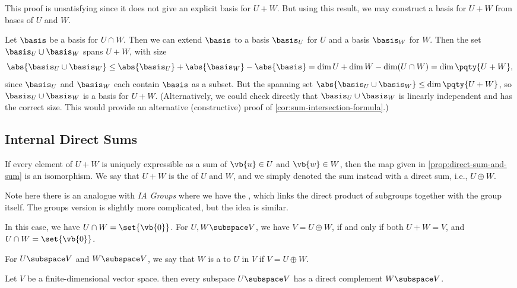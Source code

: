 This proof is unsatisfying since it does not give an explicit basis for \(U + W\). But using this result, we may construct a basis for \(U + W\) from bases of \(U\) and \(W\).

Let \(\basis\) be a basis for \(U \cap W\). Then we can extend \(\basis\) to a basis \(\basis_U\) for \(U\) and a basis \(\basis_W\) for \(W\). Then the set \(\basis_U \cup \basis_W\) spans \(U + W\), with size
\[
    \abs{\basis_U \cup \basis_W} \leq \abs{\basis_U} + \abs{\basis_W} - \abs{\basis} = \dim U + \dim W - \dim(U \cap W) = \dim \pqty{U + W},
\]
since \(\basis_U\) and \(\basis_W\) each contain \(\basis\) as a subset. But the spanning set \(\abs{\basis_U \cup \basis_W} \leq \dim \pqty{U + W}\), so \(\basis_U \cup \basis_W\) is a basis for \(U + W\). (Alternatively, we could check directly that \(\basis_U \cup \basis_W\) is linearly independent and has the correct size. This would provide an alternative (constructive) proof of \autoref{cor:sum-intersection-formula}.)

\subsection{Internal Direct Sums}

If every element of \(U + W\) is uniquely expressible as a sum of \(\vb{u} \in U\) and \(\vb{w} \in W\), then the map given in \autoref{prop:direct-sum-and-sum} is an isomorphism. We say that \(U + W\) is the  of \(U\) and \(W\), and we simply denoted the sum instead with a direct sum, i.e., \(U \oplus W\).

\begin{remark}
    Note here there is an analogue with \textit{IA Groups} where we have the , which links the direct product of subgroups together with the group itself. The groups version is slightly more complicated, but the idea is similar.
\end{remark}

In this case, we have \(U \cap W = \set{\vb{0}}\). For \(U, W \subspace V\), we have \(V = U \oplus W\), if and only if both \(U + W = V\), and \(U \cap W = \set{\vb{0}}\).

\begin{definition}
    For \(U \subspace V\) and \(W \subspace V\), we say that \(W\) is a  to \(U\) in \(V\) if \(V = U \oplus W\).
\end{definition}

\begin{proposition}
    Let \(V\) be a finite-dimensional vector space. then every subspace \(U \subspace V\) has a direct complement \(W \subspace V\).
\end{proposition}


